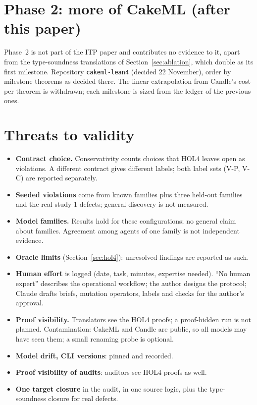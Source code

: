 \documentclass[11pt,a4paper]{article}
\newcommand{\code}[1]{\texttt{#1}}
\begin{document}
\section{Phase 2: more of CakeML (after this paper)}\label{sec:phase2}
Phase~2 is not part of the ITP paper and contributes no evidence to it, apart from the type-soundness translations of Section~\ref{sec:ablation}, which double as its first milestone. Repository \code{cakeml-lean4} (decided 22 November), order by milestone theorems as decided there. The linear extrapolation from Candle's cost per theorem is withdrawn; each milestone is sized from the ledger of the previous ones.

\section{Threats to validity}
\begin{itemize}
\item \textbf{Contract choice.} Conservativity counts choices that HOL4 leaves open as violations. A different contract gives different labels; both label sets (V-P, V-C) are reported separately.
\item \textbf{Seeded violations} come from known families plus three held-out families and the real study-1 defects; general discovery is not measured.
\item \textbf{Model families.} Results hold for these configurations; no general claim about families. Agreement among agents of one family is not independent evidence.
\item \textbf{Oracle limits} (Section~\ref{sec:hol4}): unresolved findings are reported as such.
\item \textbf{Human effort} is logged (date, task, minutes, expertise needed). ``No human expert'' describes the operational workflow; the author designs the protocol; Claude drafts briefs, mutation operators, labels and checks for the author's approval.
\item \textbf{Proof visibility.} Translators see the HOL4 proofs; a proof-hidden run is not planned. Contamination: CakeML and Candle are public, so all models may have seen them; a small renaming probe is optional.
\item \textbf{Model drift, CLI versions}: pinned and recorded.
\item \textbf{Proof visibility of audits}: auditors see HOL4 proofs as well.
\item \textbf{One target closure} in the audit, in one source logic, plus the type-soundness closure for real defects.
\end{itemize}
\end{document}
